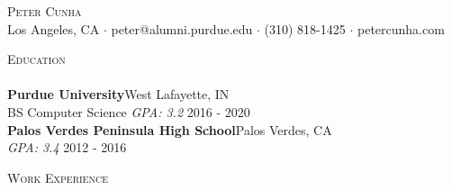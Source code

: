 \documentclass[a4paper]{article}
\newcommand{\lineunder} {
    \vspace*{-8pt} \\
    \hspace*{-18pt} \hrulefill \\
}
\newcommand{\header} [1] {
    {\hspace*{-18pt}\vspace*{6pt} \textsc{#1}}
    \vspace*{-6pt} \lineunder
}
\begin{document}
\vspace*{-40pt}

    

\vspace*{-10pt}
\begin{center}
	{\Huge \scshape {Peter Cunha}}\\
	Los Angeles, CA $\cdot$ peter@alumni.purdue.edu $\cdot$ (310) 818-1425 $\cdot$ petercunha.com\\
\end{center}

\header{Education}
\textbf{Purdue University}\hfill West Lafayette, IN\\
BS Computer Science \textit{GPA: 3.2} \hfill 2016 - 2020\\
\vspace{2mm}
\textbf{Palos Verdes Peninsula High School}\hfill Palos Verdes, CA\\
\textit{GPA: 3.4} \hfill 2012 - 2016\\
\vspace{2mm}

\header{Work Experience}
\vspace{1mm}
\end{document}
